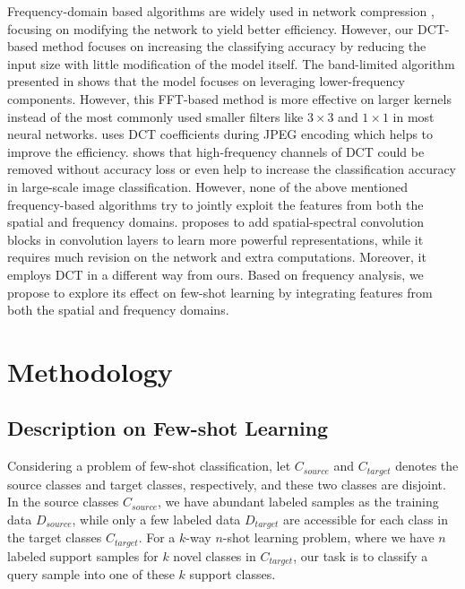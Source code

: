 \documentclass[10pt, conference, compsocconf]{IEEEtran}
\begin{document}
Frequency-domain based algorithms are widely used in network compression \cite{wang2018packing,chen2016compressing}, focusing on modifying the network to yield better efficiency. However, our DCT-based method focuses on increasing the classifying accuracy by reducing the input size with little modification of the model itself. The band-limited algorithm presented in \cite{dziedzic2019band} shows that the model focuses on leveraging lower-frequency components. However, this FFT-based method is more effective on larger kernels instead of the most commonly used smaller filters like $3\times 3$ and $1\times 1$ in most neural networks. \cite{gueguen2018faster} uses DCT coefficients during JPEG encoding which helps to improve the efficiency.  \cite{XuKai2020} shows that high-frequency channels of DCT could be removed without accuracy loss or even help to increase the classification accuracy in large-scale image classification. However, none of the above mentioned frequency-based algorithms try to jointly exploit the features from both the spatial and frequency domains. \cite{xu2019shifted} proposes to add spatial-spectral convolution blocks in convolution layers to learn more powerful representations, while it requires much revision on the network and extra computations. Moreover, it employs DCT in a different way from ours. Based on frequency analysis, 
we propose to explore its effect on few-shot learning by integrating features from both the spatial and frequency domains. 

\section{Methodology}

\subsection{Description on Few-shot Learning}

Considering a problem of few-shot classification, let $C_{source}$ and $C_{target}$ denotes the source classes and target classes, respectively, and these two classes are disjoint.  In the source classes $C_{source}$, we have abundant labeled samples as the training data $D_{source}$, while only a few labeled data $D_{target}$ are accessible for each class in the target classes $C_{target}$.  For a $k$-way $n$-shot learning problem, where we have $n$ labeled support samples for $k$ novel classes in $C_{target}$, our task is to classify a query sample into one of these $k$ support classes.
\end{document}
